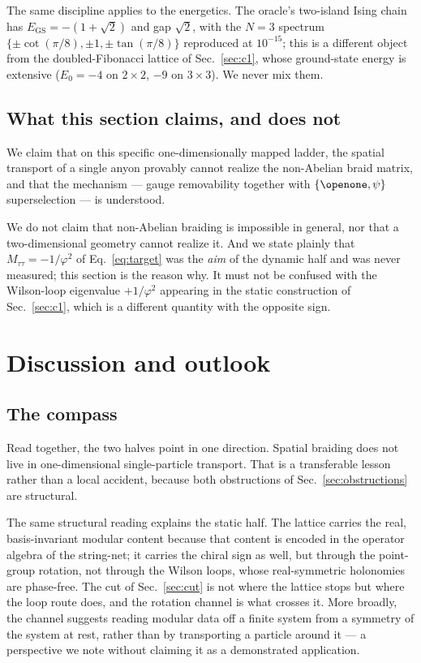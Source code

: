 \documentclass[aps,pra,twocolumn,superscriptaddress,longbibliography,floatfix,nofootinbib]{revtex4-2}
\newcommand{\Id}{\openone}
\begin{document}
The same discipline applies to the energetics. The oracle's two-island Ising
chain has $E_{\mathrm{GS}}=-(1+\sqrt2)$ and gap $\sqrt2$, with the $N=3$
spectrum $\{\pm\cot(\pi/8),\pm1,\pm\tan(\pi/8)\}$ reproduced at $10^{-15}$;
this is a different object from the doubled-Fibonacci lattice of
Sec.~\ref{sec:c1}, whose ground-state energy is extensive ($E_0=-4$ on
$2\times2$, $-9$ on $3\times3$). We never mix them.

\subsection{What this section claims, and does not}
\label{sec:nogoclaims}

We claim that on this specific one-dimensionally mapped ladder, the spatial
transport of a single anyon provably cannot realize the non-Abelian braid
matrix, and that the mechanism --- gauge removability together with
$\{\Id,\psi\}$ superselection --- is understood.

We do not claim that non-Abelian braiding is impossible in general, nor that a
two-dimensional geometry cannot realize it. And we state plainly that
$M_{\tau\tau}=-1/\varphi^{2}$ of Eq.~\eqref{eq:target} was the \emph{aim} of
the dynamic half and was never measured; this section is the reason why. It
must not be confused with the Wilson-loop eigenvalue $+1/\varphi^{2}$ appearing
in the static construction of Sec.~\ref{sec:c1}, which is a different quantity
with the opposite sign.

\section{Discussion and outlook}
\label{sec:discussion}

\subsection{The compass}
\label{sec:compass}

Read together, the two halves point in one direction. Spatial braiding does
not live in one-dimensional single-particle transport. That is a transferable
lesson rather than a local accident, because both obstructions of
Sec.~\ref{sec:obstructions} are structural.

The same structural reading explains the static half. The lattice carries the
real, basis-invariant modular content because that content is encoded in the
operator algebra of the string-net; it carries the chiral sign as well, but
through the point-group rotation, not through the Wilson loops, whose
real-symmetric holonomies are phase-free. The cut of Sec.~\ref{sec:cut} is not
where the lattice stops but where the loop route does, and the rotation channel
is what crosses it. More broadly, the channel suggests reading modular data off
a finite system from a symmetry of the system at rest, rather than by
transporting a particle around it --- a perspective we note without claiming it
as a demonstrated application.
\end{document}
